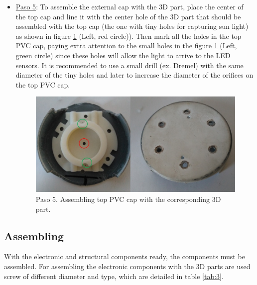 \documentclass[12pt,letterpaper]{article}
\numberwithin{figure}{section}
\numberwithin{equation}{section}
\numberwithin{table}{section}
\begin{document}
\begin{itemize}
\item \underline{Paso 5}: To assemble the external cap with the 3D part, place the center of the top cap and line it with the center hole of the 3D part that should be assembled with the top cap (the one with tiny holes for capturing sun light) as shown in figure \ref{fig:40} (Left, red circle)). Then mark all the holes in the top PVC cap, paying extra attention to the small holes in the figure \ref{fig:40} (Left, green circle) since these holes will allow the light to arrive to the LED sensors. It is recommended to use a small drill (ex. Dremel) with the same diameter of the tiny holes and later to increase the diameter of the orifices on the top PVC cap.

    \begin{figure}[H]
        \centering
        \includegraphics[scale=0.6]{Figuras/figure_40.jpg}
        \caption{Paso 5. Assembling top PVC cap with the corresponding 3D part.}
        \label{fig:40}    
    \end{figure}
    
\end{itemize}


\subsection{Assembling}

%
%

With the electronic and structural components ready, the components must be assembled. For assembling the electronic components with the 3D parts are used screw of different diameter and type, which are detailed in table \ref{tab:3}.
\end{document}
